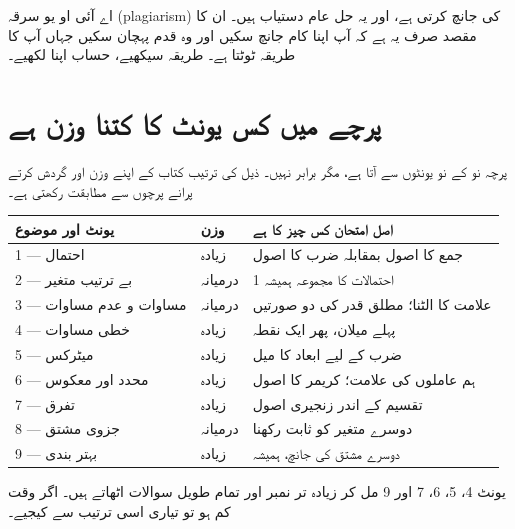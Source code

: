 \begin{ghalti}
اے آئی او یو سرقہ (\textenglish{plagiarism}) کی جانچ کرتی ہے، اور یہ حل عام
دستیاب ہیں۔ ان کا مقصد صرف یہ ہے کہ آپ اپنا کام جانچ سکیں اور وہ قدم پہچان سکیں
جہاں آپ کا طریقہ ٹوٹتا ہے۔ طریقہ سیکھیے، حساب اپنا لکھیے۔
\end{ghalti}

\section*{پرچے میں کس یونٹ کا کتنا وزن ہے}

پرچہ نو کے نو یونٹوں سے آتا ہے، مگر برابر نہیں۔ ذیل کی ترتیب کتاب کے اپنے وزن
اور گردش کرتے پرانے پرچوں سے مطابقت رکھتی ہے۔

\medskip
\begin{center}
\begin{tabular}{@{}p{4.6cm} p{2.4cm} p{6.4cm}@{}}
\toprule
\textbf{یونٹ اور موضوع} & \textbf{وزن} & \textbf{اصل امتحان کس چیز کا ہے} \\
\midrule
\textenglish{1} --- احتمال            & زیادہ   & جمع کا اصول بمقابلہ ضرب کا اصول \\
\textenglish{2} --- بے ترتیب متغیر    & درمیانہ & احتمالات کا مجموعہ ہمیشہ \textenglish{1} \\
\textenglish{3} --- مساوات و عدم مساوات & درمیانہ & علامت کا الٹنا؛ مطلق قدر کی دو صورتیں \\
\textenglish{4} --- خطی مساوات        & زیادہ   & پہلے میلان، پھر ایک نقطہ \\
\textenglish{5} --- میٹرکس            & زیادہ   & ضرب کے لیے ابعاد کا میل \\
\textenglish{6} --- محدد اور معکوس    & زیادہ   & ہم عاملوں کی علامت؛ کریمر کا اصول \\
\textenglish{7} --- تفرق              & زیادہ   & تقسیم کے اندر زنجیری اصول \\
\textenglish{8} --- جزوی مشتق         & درمیانہ & دوسرے متغیر کو ثابت رکھنا \\
\textenglish{9} --- بہتر بندی         & زیادہ   & دوسرے مشتق کی جانچ، ہمیشہ \\
\bottomrule
\end{tabular}
\end{center}

\medskip
\noindent
یونٹ \textenglish{4}، \textenglish{5}، \textenglish{6}، \textenglish{7} اور
\textenglish{9} مل کر زیادہ تر نمبر اور تمام طویل سوالات اٹھاتے ہیں۔ اگر وقت کم
ہو تو تیاری اسی ترتیب سے کیجیے۔

\clearpage

